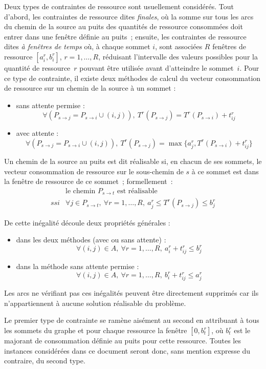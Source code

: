\documentclass[10pt,francais]{llncs}
\begin{document}
Deux types de contraintes de ressource sont usuellement consid\'er\'es. Tout d'abord, les contraintes de ressource dites {\em finales}, o\`u la somme sur tous les arcs du chemin de la source au puits des quantit\'es de ressource consomm\'ees doit entrer dans une fen\^etre d\'efinie au puits~; ensuite, les contraintes de ressource dites {\em \`a fen\^etres de temps} o\`u, \`a chaque sommet $i$, sont associ\'ees $R$ fen\^etres de ressource $[a_i^r,b_i^r]$, $r=1,\ldots,R$, r\'eduisant l'intervalle des valeurs possibles pour la quantit\'e de ressource~$r$ pouvant \^etre utilis\'ee avant d'atteindre le sommet~$i$. Pour ce type de contrainte, il existe deux m\'ethodes de calcul du vecteur consommation de ressource sur un chemin de la source \`a un sommet :
\begin{itemize}
\item sans attente permise : 
		$$\forall (P_{s \to j} = P_{s \to i} \cup (i,j)),\ T^r(P_{s \to j}) = T^r(P_{s \to i}) + t_{ij}^r$$
\item avec attente : 
		$$\forall (P_{s \to j} = P_{s \to i} \cup (i,j)),\ T^r(P_{s \to j}) = \max \{a_j^r, T^r(P_{s \to i}) + t_{ij}^r\}$$
\end{itemize}
Un chemin de la source au puits est dit r\'ealisable si, en chacun de ses sommets, le vecteur consommation de ressource sur le sous-chemin de $s$ \`a ce sommet est dans la fen\^etre de ressource de ce sommet~; formellement~:
$$\begin{array}{ll}
                    &\textrm{le chemin }P_{s \to t}\textrm{ est r\'ealisable}\\
\textit{ssi} 	&\forall j \in P_{s \to t},\ \forall r=1,\ldots,R,\ a_j^r \leq T^r(P_{s \to j}) \leq b_j^r
\end{array}$$

De cette in\'egalit\'e d\'ecoule deux propri\'et\'es g\'en\'erales :
\begin{itemize}
 \item dans les deux m\'ethodes (avec ou sans attente) :
$$\forall (i,j)\in A,\ \forall r=1,\ldots,R,\ a_i^r + t_{ij}^r \leq b_j^r$$
 \item dans la m\'ethode sans attente permise :
$$\forall (i,j)\in A,\ \forall r=1,\ldots,R,\ b_i^r + t_{ij}^r \leq a_j^r$$
\end{itemize}
Les arcs ne v\'erifiant pas ces in\'egalit\'es peuvent \^etre directement supprim\'es car ils n'appartiennent \`a aucune solution r\'ealisable du probl\`eme.

Le premier type de contrainte se ram\`ene ais\'ement au second en attribuant \`a tous les sommets du graphe et pour chaque ressource la fen\^etre $[0,b_t^r]$, o\`u  $b_t^r$ est le majorant de consommation d\'efinie au puits pour cette ressource. Toutes les instances consid\'er\'ees dans ce document seront donc, sans mention expresse du contraire, du second type. 
\end{document}
